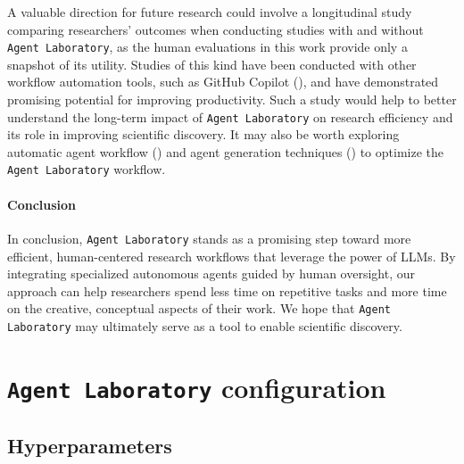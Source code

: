 \documentclass[11pt, a4paper]{gdm_format}
\begin{document}
A valuable direction for future research could involve a longitudinal study comparing researchers' outcomes when conducting studies with and without \texttt{Agent Laboratory}, as the human evaluations in this work provide only a snapshot of its utility. Studies of this kind have been conducted with other workflow automation tools, such as GitHub Copilot (\cite{dohmke2023sea, ziegler2024measuring}), and have demonstrated promising potential for improving productivity. Such a study would help to better understand the long-term impact of \texttt{Agent Laboratory} on research efficiency and its role in improving scientific discovery. It may also be worth exploring automatic agent workflow (\cite{li2024autoflow,zhugegptswarm, hong2023metagpt}) and agent generation techniques (\cite{chen2023autoagents, hu2024automated}) to optimize the \texttt{Agent Laboratory} workflow.

\paragraph{Conclusion} In conclusion, \texttt{Agent Laboratory} stands as a promising step toward more efficient, human-centered research workflows that leverage the power of LLMs. By integrating specialized autonomous agents guided by human oversight, our approach can help researchers spend less time on repetitive tasks and more time on the creative, conceptual aspects of their work. We hope that \texttt{Agent Laboratory} may ultimately serve as a tool to enable scientific discovery.





\clearpage

\appendix

\section{\texttt{Agent Laboratory} configuration}

\subsection{Hyperparameters}
\end{document}

